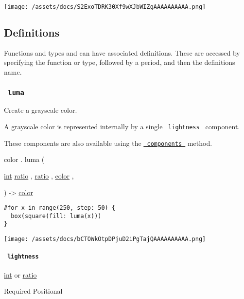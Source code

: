 \texttt{[image: /assets/docs/S2ExoTDRK30Xf9wXJbWIZgAAAAAAAAAA.png]}

\subsection{\texorpdfstring{{ Definitions
}}{ Definitions }}\label{definitions}

\label{definitions-tooltip}
Functions and types and can have associated definitions. These are
accessed by specifying the function or type, followed by a period, and
then the definition\textquotesingle s name.

\subsubsection{\texorpdfstring{\texttt{\ luma\ }}{ luma }}\label{definitions-luma}

Create a grayscale color.

A grayscale color is represented internally by a single
\texttt{\ lightness\ } component.

These components are also available using the
\href{/docs/reference/visualize/color/\#definitions-components}{\texttt{\ components\ }}
method.

color { . } { luma } (

{ \href{/docs/reference/foundations/int/}{int}
\href{/docs/reference/layout/ratio/}{ratio} , } {
\href{/docs/reference/layout/ratio/}{ratio} , } {
\href{/docs/reference/visualize/color/}{color} , }

) -\textgreater{} \href{/docs/reference/visualize/color/}{color}

\begin{verbatim}
#for x in range(250, step: 50) {
  box(square(fill: luma(x)))
}
\end{verbatim}

\texttt{[image: /assets/docs/bCTOWkOtpDPjuD2iPgTajQAAAAAAAAAA.png]}

\paragraph{\texorpdfstring{\texttt{\ lightness\ }}{ lightness }}\label{definitions-luma-lightness}

\href{/docs/reference/foundations/int/}{int} {or}
\href{/docs/reference/layout/ratio/}{ratio}

{Required} {{ Positional }}

